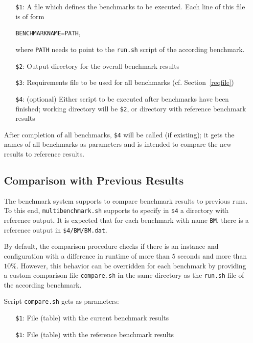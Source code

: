 \documentclass[a4paper]{article}
\begin{document}
			    \medskip{}
			    \begin{itemize}
					\item[{\tt \$1}:] A file which defines the benchmarks to be executed.
						Each line of this file is of form
						\begin{center}
							{\tt BENCHMARKNAME=PATH},
						\end{center}
						where {\tt PATH} needs to point to the {\tt run.sh} script of the according benchmark.
					\item[{\tt \$2}:] Output directory for the overall benchmark results
					\item[{\tt \$3}:] Requirements file to be used for all benchmarks (cf. Section~\ref{reqfile})
					\item[{\tt \$4}:] (optional) Either script to be executed after benchmarks have been finished; working directory will be {\tt \$2},
					    or directory with reference benchmark results
			    \end{itemize}
			
				After completion of all benchmarks, {\tt \$4} will be called (if existing); it gets the names of all benchmarks as parameters
				and is intended to compare the new results to reference results.
					
		\subsection{Comparison with Previous Results}
					
			The benchmark system supports to compare benchmark results
			to previous runs.
			To this end, {\tt multibenchmark.sh}
			supports to specify in {\tt \$4} a directory with reference output.
			It is expected that for each benchmark with name {\tt BM},
			there is a reference output in {\tt \$4/BM/BM.dat}.
			
			By default, the comparison procedure checks if there is an
			instance and configuration with a difference in runtime of more than $5$ seconds and more than $10\%$.
			However, this behavior can be overridden for each benchmark
			by providing a custom comparison file {\tt compare.sh}
			in the same directory as the {\tt run.sh} file of the according benchmark.
			
			Script {\tt compare.sh} gets as parameters:
			    \begin{itemize}
					\item[{\tt \$1}:] File (table) with the current benchmark results
					\item[{\tt \$1}:] File (table) with the reference benchmark results
			    \end{itemize}
			
\end{document}
